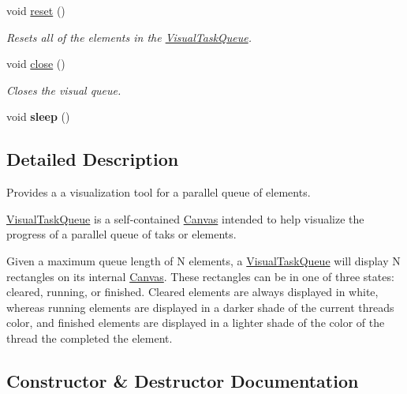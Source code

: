 \begin{DoxyCompactItemize}
void \hyperlink{classtsgl_1_1_visual_task_queue_a1cd23a5361c0209ac950db6afcd68a19}{reset} ()
\begin{DoxyCompactList}\small\item\em Resets all of the elements in the \hyperlink{classtsgl_1_1_visual_task_queue}{Visual\+Task\+Queue}. \end{DoxyCompactList}\item 
void \hyperlink{classtsgl_1_1_visual_task_queue_a7340d211424a9f947152fed22cce4d79}{close} ()
\begin{DoxyCompactList}\small\item\em Closes the visual queue. \end{DoxyCompactList}\item 
\mbox{\label{classtsgl_1_1_visual_task_queue_aef4f0fbf136cd8d406834a1861a2a1d7}} 
void {\bfseries sleep} ()
\end{DoxyCompactItemize}


\subsection{Detailed Description}
Provides a a visualization tool for a parallel queue of elements. 

\hyperlink{classtsgl_1_1_visual_task_queue}{Visual\+Task\+Queue} is a self-\/contained \hyperlink{classtsgl_1_1_canvas}{Canvas} intended to help visualize the progress of a parallel queue of taks or elements.

Given a maximum queue length of {\ttfamily N} elements, a \hyperlink{classtsgl_1_1_visual_task_queue}{Visual\+Task\+Queue} will display {\ttfamily N} rectangles on its internal \hyperlink{classtsgl_1_1_canvas}{Canvas}. These rectangles can be in one of three states\+: cleared, running, or finished. Cleared elements are always displayed in white, whereas running elements are displayed in a darker shade of the current thread\textquotesingle{}s color, and finished elements are displayed in a lighter shade of the color of the thread the completed the element. 

\subsection{Constructor \& Destructor Documentation}
\mbox{\label{classtsgl_1_1_visual_task_queue_ad82aabf35ec367b2b0c5894999f5e76e}} 
